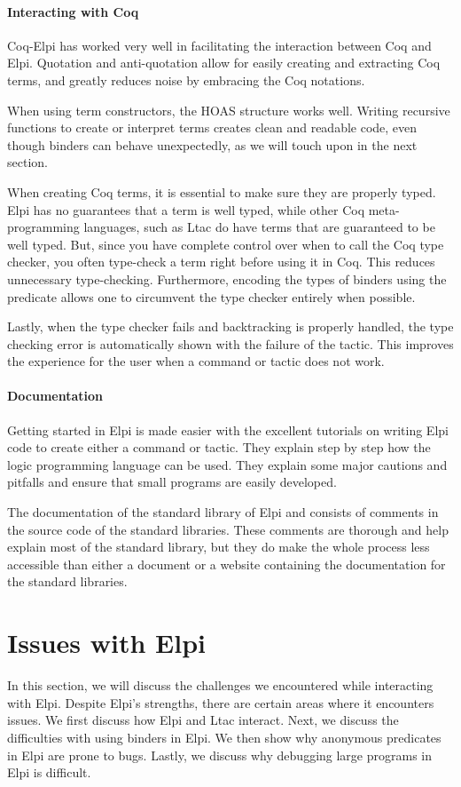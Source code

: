 \documentclass[thesis.tex]{subfiles}
\begin{document}
\paragraph{Interacting with Coq}
Coq-Elpi has worked very well in facilitating the interaction between Coq and Elpi. Quotation and anti-quotation allow for easily creating and extracting Coq terms, and greatly reduces noise by embracing the Coq notations.

When using term constructors, the HOAS structure works well. Writing recursive functions to create or interpret terms creates clean and readable code, even though binders can behave unexpectedly, as we will touch upon in the next section.

When creating Coq terms, it is essential to make sure they are properly typed. Elpi has no guarantees that a term is well typed, while other Coq meta-programming languages, such as Ltac do have terms that are guaranteed to be well typed. But, since you have complete control over when to call the Coq type checker, you often type-check a term right before using it in Coq. This reduces unnecessary type-checking. Furthermore, encoding the types of binders using the  predicate allows one to circumvent the type checker entirely when possible.

Lastly, when the type checker fails and backtracking is properly handled, the type checking error is automatically shown with the failure of the tactic. This improves the experience for the user when a command or tactic does not work.

\paragraph{Documentation}
Getting started in Elpi is made easier with the excellent tutorials on writing Elpi code to create either a command or tactic. They explain step by step how the logic programming language can be used. They explain some major cautions and pitfalls and ensure that small programs are easily developed.

The documentation of the standard library of Elpi and \ce consists of comments in the source code of the standard libraries. These comments are thorough and help explain most of the standard library, but they do make the whole process less accessible than either a document or a website containing the documentation for the standard libraries.

\section{Issues with Elpi}\label{sec:elpibad}
In this section, we will discuss the challenges we encountered while interacting with Elpi. Despite Elpi's strengths, there are certain areas where it encounters issues. We first discuss how Elpi and Ltac interact. Next, we discuss the difficulties with using binders in Elpi. We then show why anonymous predicates in Elpi are prone to bugs. Lastly, we discuss why debugging large programs in Elpi is difficult.
\end{document}
